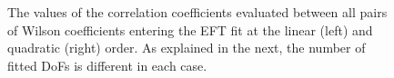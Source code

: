 \documentclass[withindex,glossary]{cam-thesis}
\begin{document}
\begin{figure}[htb!]
\centering
	\caption{The values of the correlation coefficients evaluated
          between all pairs of Wilson coefficients entering the
          EFT fit at the  linear (left) and quadratic (right)  order.
          As explained in the next, the number of fitted DoFs is different
          in each case.
        }
\label{fig:bsmcorr}
\end{figure}
\end{document}

